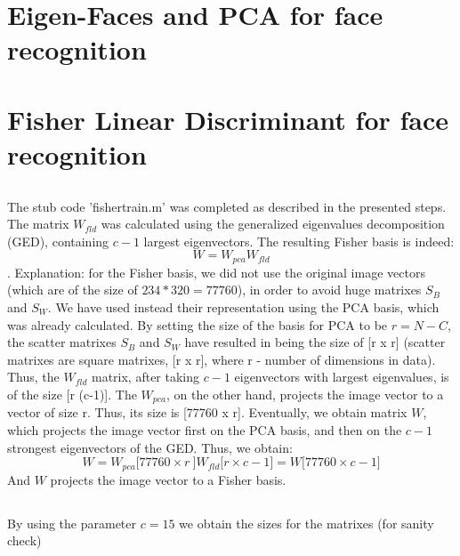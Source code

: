 \documentclass[a4paper]{iacas}
\begin{document}
\section{Eigen-Faces and PCA for face recognition}


















\newpage
\section{Fisher Linear Discriminant for face recognition}


\subsection{}
The stub code 'fishertrain.m' was completed as described in the presented steps. The matrix $W_{fld}$ was calculated using the generalized eigenvalues decomposition (GED), containing $c-1$ largest eigenvectors. The resulting Fisher basis is indeed: $$W=W_{pca}W_{fld}$$. Explanation: for the Fisher basis, we did not use the original image vectors (which are of the size of $234*320=77760$), in order to avoid huge matrixes $S_{B}$ and $S_{W}$. We have used instead their representation using the PCA basis, which was already calculated. By setting the size of the basis for PCA to be $r = N-C$, the scatter matrixes   $S_{B}$ and $S_{W}$  have resulted in being the size of [r x r] (scatter matrixes are square matrixes, [r x r], where r - number of dimensions in data). Thus, the $W_{fld}$ matrix, after taking $c-1$ eigenvectors with largest eigenvalues, is of the size [r (c-1)]. The $W_{pca}$, on the other hand, projects the image vector to a vector of size r. Thus, its size is [77760 x r].  Eventually, we obtain matrix $W$, which projects the image vector first on the PCA basis, and then on the $c-1$ strongest eigenvectors of the GED. Thus, we obtain:
$$W = W_{pca}{[} 77760 \times r\ {]}W_{fld}{[} r \times c-1 {]} = W{[} 77760 \times c-1 {]}$$
And $W$ projects the image vector to a Fisher basis.

\subsection{}
By using the parameter $c=15$ we obtain the sizes for the matrixes (for sanity check)
\end{document}
